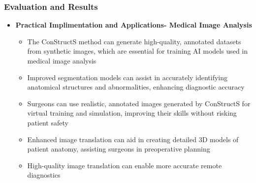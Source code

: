 \documentclass[aspectratio=169, lecture, amberg]{OTHAWbeamer}
\begin{document}
\begin{frame}
    \frametitle{Evaluation and Results}
    \begin{itemize}
        \item \textbf{Practical Implimentation and Applications- Medical Image Analysis}
        \vspace{0.2cm}
        \begin{itemize}
            \item <1-> The ConStructS method can generate high-quality, annotated datasets from synthetic images, which are essential for training AI models used in medical image analysis
            \vspace{0.2cm}
            \item <2-> Improved segmentation models can assist in accurately identifying anatomical structures and abnormalities, enhancing diagnostic accuracy
            \vspace{0.2cm}
            \item <3-> Surgeons can use realistic, annotated images generated by ConStructS for virtual training and simulation, improving their skills without risking patient safety
            \vspace{0.2cm}
            \item <4-> Enhanced image translation can aid in creating detailed 3D models of patient anatomy, assisting surgeons in preoperative planning
            \vspace{0.2cm}
            \item <5-> High-quality image translation can enable more accurate remote diagnostics
        \end{itemize}
    \end{itemize}
    
\end{frame}
\end{document}
